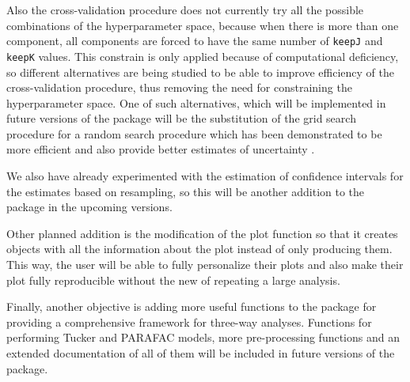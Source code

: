 Also the cross-validation procedure does not currently try all the possible combinations of the hyperparameter space, because when there is more than one component, all components are forced to have the same number of \texttt{keepJ} and \texttt{keepK} values. This constrain is only applied because of computational deficiency, so different alternatives are being studied to be able to improve efficiency of the cross-validation procedure, thus removing the need for constraining the hyperparameter space. One of such alternatives, which will be implemented in future versions of the package will be the substitution of the grid search procedure for a random search procedure which has been demonstrated to be more efficient and also provide better estimates of uncertainty \parencite{bergstra2012random}.

We also have already experimented with the estimation of confidence intervals for the estimates based on resampling, so this will be another addition to the package in the upcoming versions.

Other planned addition is the modification of the plot function so that it creates objects with all the information about the plot instead of only producing them. This way, the user will be able to fully personalize their plots and also make their plot fully reproducible without the new of repeating a large analysis.

Finally, another objective is adding more useful functions to the package for providing a comprehensive framework for three-way analyses. Functions for performing Tucker and PARAFAC models, more pre-processing functions and an extended documentation of all of them will be included in future versions of the package.
